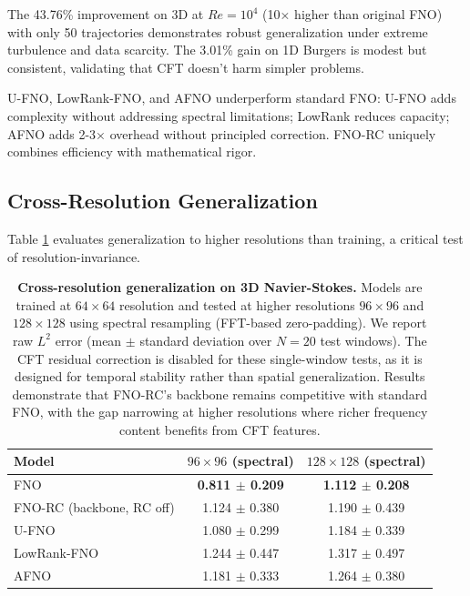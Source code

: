 \documentclass[11pt]{article}
\begin{document}
The 43.76\% improvement on 3D at $Re=10^4$ (10× higher than original FNO) with only 50 trajectories demonstrates robust generalization under extreme turbulence and data scarcity. The 3.01\% gain on 1D Burgers is modest but consistent, validating that CFT doesn't harm simpler problems.

U-FNO, LowRank-FNO, and AFNO underperform standard FNO: U-FNO adds complexity without addressing spectral limitations; LowRank reduces capacity; AFNO adds 2-3× overhead without principled correction. FNO-RC uniquely combines efficiency with mathematical rigor.

\subsection{Cross-Resolution Generalization}

Table \ref{tab:crossres} evaluates generalization to higher resolutions than training, a critical test of resolution-invariance.

\begin{table}[h]
\centering
\caption{\textbf{Cross-resolution generalization on 3D Navier-Stokes.} Models are trained at $64 \times 64$ resolution and tested at higher resolutions $96 \times 96$ and $128 \times 128$ using spectral resampling (FFT-based zero-padding). We report raw $L^2$ error (mean $\pm$ standard deviation over $N=20$ test windows). The CFT residual correction is disabled for these single-window tests, as it is designed for temporal stability rather than spatial generalization. Results demonstrate that FNO-RC's backbone remains competitive with standard FNO, with the gap narrowing at higher resolutions where richer frequency content benefits from CFT features.}
\label{tab:crossres}
\small
\begin{tabular}{@{}lcc@{}}
\toprule
\textbf{Model} & \textbf{$96 \times 96$ (spectral)} & \textbf{$128 \times 128$ (spectral)} \\
\midrule
FNO & \textbf{0.811 $\pm$ 0.209} & \textbf{1.112 $\pm$ 0.208} \\
FNO-RC (backbone, RC off) & 1.124 $\pm$ 0.380 & 1.190 $\pm$ 0.439 \\
U-FNO & 1.080 $\pm$ 0.299 & 1.184 $\pm$ 0.339 \\
LowRank-FNO & 1.244 $\pm$ 0.447 & 1.317 $\pm$ 0.497 \\
AFNO & 1.181 $\pm$ 0.333 & 1.264 $\pm$ 0.380 \\
\bottomrule
\end{tabular}
\end{table}
\end{document}
